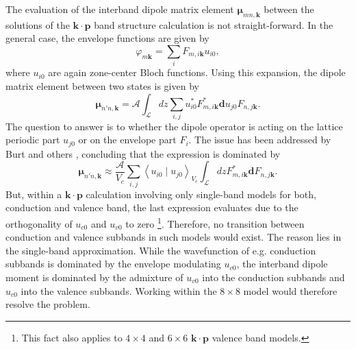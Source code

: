 The evaluation of the interband dipole matrix element $\boldsymbol{\mu}_{mn,\mathbf{k}}$
between the solutions of the $\mathbf{k}\cdot\mathbf{p}$ band structure
calculation is not straight-forward. In the general case, the envelope
functions are given by\begin{equation}
\varphi_{m\mathbf{k}}=\sum_{i}F_{m,i\mathbf{k}}u_{i0},\end{equation}
where $u_{i0}$ are again zone-center Bloch functions. Using this
expansion, the dipole matrix element between two states is given by
\begin{equation}
\boldsymbol{\mu}_{n'n,\mathbf{k}}=\mathcal{A}\int_{\mathcal{L}}dz\sum_{i,j}u_{i0}^{*}F_{m,i\mathbf{k}}^{*}\mathbf{d}u_{j0}F_{n,j\mathbf{k}}.\end{equation}
The question to answer is to whether the dipole operator is acting
on the lattice periodic part $u_{j0}$ or on the envelope part $F_{i}$.
The issue has been addressed by Burt and others \citealp{Burt1995,Burt1993},
concluding that the expression is dominated by\begin{equation}
\boldsymbol{\mu}_{n'n,\mathbf{k}}\approx\frac{\mathcal{A}}{V_{c}}\sum_{i,j}\left\langle u_{i0}\mid u_{j0}\right\rangle _{V_{c}}\int_{\mathcal{L}}dzF_{m,i\mathbf{k}}^{*}\mathbf{d}F_{n,j\mathbf{k}}.\end{equation}
But, within a $\mathbf{k}\cdot\mathbf{p}$ calculation involving only
single-band models for both, conduction and valence band, the last
expression evaluates due to the orthogonality of $u_{c0}$ and $u_{v0}$
to zero%
\footnote{This fact also applies to $4\times4$ and $6\times6$ $\mathbf{k}\cdot\mathbf{p}$
valence band models.%
}. Therefore, no transition between conduction and valence subbands
in such models would exist. The reason lies in the single-band approximation.
While the wavefunction of e.g. conduction subbands is dominated by
the envelope modulating $u_{c0}$, the interband dipole moment is
dominated by the admixture of $u_{v0}$ into the conduction subbands
and $u_{c0}$ into the valence subbands. Working within the $8\times8$
model would therefore resolve the problem.

